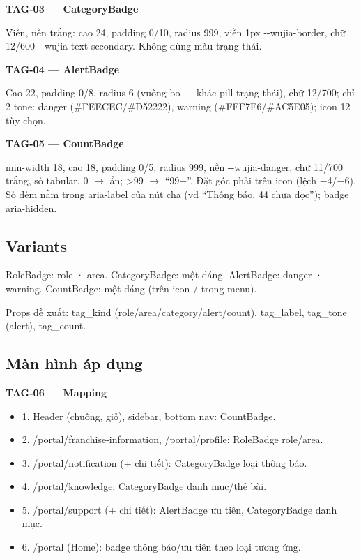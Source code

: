 \documentclass[11pt,a4paper]{report}
\begin{document}
\par\smallskip\textbf{TAG-03 — CategoryBadge}\par
Viền, nền trắng: cao 24, padding 0/\allowbreak{}10, radius 999, viền 1px -\kern0pt-\allowbreak{}wujia-\allowbreak{}border, chữ 12/\allowbreak{}600 -\kern0pt-\allowbreak{}wujia-\allowbreak{}text-\allowbreak{}secondary. Không dùng màu trạng thái.\par

\par\smallskip\textbf{TAG-04 — AlertBadge}\par
Cao 22, padding 0/\allowbreak{}8, radius 6 (vuông bo — khác pill trạng thái), chữ 12/\allowbreak{}700; chỉ 2 tone: danger (\#FEECEC/\allowbreak{}\#D52222), warning (\#FFF7E6/\allowbreak{}\#AC5E05); icon 12 tùy chọn.\par

\par\smallskip\textbf{TAG-05 — CountBadge}\par
min-\allowbreak{}width 18, cao 18, padding 0/\allowbreak{}5, radius 999, nền -\kern0pt-\allowbreak{}wujia-\allowbreak{}danger, chữ 11/\allowbreak{}700 trắng, số tabular. 0 \(\to\) ẩn; \textgreater{}99 \(\to\) “99+”. Đặt góc phải trên icon (lệch \(-\)4/\allowbreak{}\(-\)6). Số đếm nằm trong aria-\allowbreak{}label của nút cha (vd “Thông báo, 44 chưa đọc”); badge aria-\allowbreak{}hidden.\par
\subsection*{Variants}
RoleBadge: role · area. CategoryBadge: một dáng. AlertBadge: danger · warning. CountBadge: một dáng (trên icon / trong menu).\par
Props đề xuất: tag\_kind (role/\allowbreak{}area/\allowbreak{}category/\allowbreak{}alert/\allowbreak{}count), tag\_label, tag\_tone (alert), tag\_count.\par
\subsection*{Màn hình áp dụng}
\par\smallskip\textbf{TAG-06 — Mapping}\par
\begin{itemize}[label={}]
\item 1. Header (chuông, giỏ), sidebar, bottom nav: CountBadge.
\item 2. /portal/\allowbreak{}franchise-\allowbreak{}information, /portal/\allowbreak{}profile: RoleBadge role/\allowbreak{}area.
\item 3. /portal/\allowbreak{}notification (+ chi tiết): CategoryBadge loại thông báo.
\item 4. /portal/\allowbreak{}knowledge: CategoryBadge danh mục/\allowbreak{}thẻ bài.
\item 5. /portal/\allowbreak{}support (+ chi tiết): AlertBadge ưu tiên, CategoryBadge danh mục.
\item 6. /portal (Home): badge thông báo/\allowbreak{}ưu tiên theo loại tương ứng.
\end{itemize}
\end{document}
